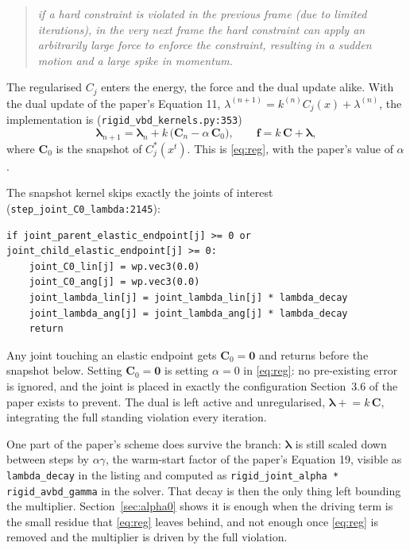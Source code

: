 \documentclass[11pt,a4paper]{article}
\begin{document}
\begin{quote}\itshape
if a hard constraint is violated in the previous frame (due to limited iterations), in the very
next frame the hard constraint can apply an arbitrarily large force to enforce the constraint,
resulting in a sudden motion and a large spike in momentum.
\end{quote}

The regularised $C_j$ enters the energy, the force and the dual update alike. With the dual
update of the paper's Equation 11, $\lambda^{(n+1)} = k^{(n)} C_j(x) + \lambda^{(n)}$, the
implementation is (\texttt{rigid\_vbd\_kernels.py:353})
\begin{equation}
  \bm{\lambda}_{n+1} = \bm{\lambda}_n + k\,\big(\mathbf{C}_n - \alpha\,\mathbf{C}_0\big),
  \qquad
  \mathbf{f} = k\,\mathbf{C} + \bm{\lambda},
  \label{eq:dual}
\end{equation}
where $\mathbf{C}_0$ is the snapshot of $C^*_j(x^t)$. This is \eqref{eq:reg}, with the paper's
value of $\alpha$.

The snapshot kernel skips exactly the joints of interest
(\texttt{step\_joint\_C0\_lambda:2145}):

\begin{lstlisting}
if joint_parent_elastic_endpoint[j] >= 0 or joint_child_elastic_endpoint[j] >= 0:
    joint_C0_lin[j] = wp.vec3(0.0)
    joint_C0_ang[j] = wp.vec3(0.0)
    joint_lambda_lin[j] = joint_lambda_lin[j] * lambda_decay
    joint_lambda_ang[j] = joint_lambda_ang[j] * lambda_decay
    return
\end{lstlisting}

Any joint touching an elastic endpoint gets $\mathbf{C}_0 = \mathbf{0}$ and returns before the
snapshot below. Setting $\mathbf{C}_0 = \mathbf{0}$ is setting $\alpha = 0$ in \eqref{eq:reg}:
no pre-existing error is ignored, and the joint is placed in exactly the configuration
Section~3.6 of the paper exists to prevent. The dual is left active and unregularised,
$\bm{\lambda} \mathrel{+}= k\,\mathbf{C}$, integrating the full standing violation every
iteration.

One part of the paper's scheme does survive the branch: $\bm{\lambda}$ is still scaled down
between steps by $\alpha\gamma$, the warm-start factor of the paper's Equation 19, visible as
\texttt{lambda\_decay} in the listing and computed as
\texttt{rigid\_joint\_alpha * rigid\_avbd\_gamma} in the solver. That decay is then the only
thing left bounding the multiplier. Section~\ref{sec:alpha0} shows it is enough when the driving
term is the small residue that \eqref{eq:reg} leaves behind, and not enough once
\eqref{eq:reg} is removed and the multiplier is driven by the full violation.
\end{document}
